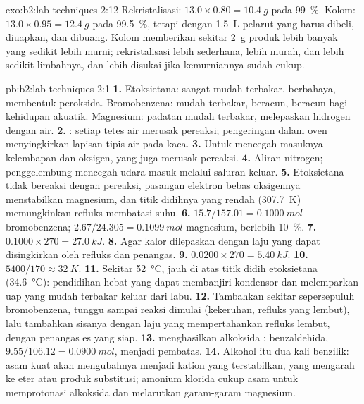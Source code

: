 \begin{solution}{exo:b2:lab-techniques-2:12}
Rekristalisasi: $13.0 \times 0.80 = \qty{10.4}{g}$ pada 99~\%. Kolom: $13.0 \times 0.95 =
\qty{12.4}{g}$ pada 99.5~\%, tetapi dengan \qty{1.5}{L} pelarut yang harus
dibeli, diuapkan, dan dibuang. Kolom memberikan sekitar \qty{2}{g} produk
lebih banyak yang sedikit lebih murni; rekristalisasi lebih sederhana,
lebih murah, dan lebih sedikit limbahnya, dan lebih disukai jika
kemurniannya sudah cukup.
\end{solution}

\begin{solution}{pb:b2:lab-techniques-2:1}
\textbf{1.} Etoksietana: sangat mudah terbakar, berbahaya, membentuk
peroksida. Bromobenzena: mudah terbakar, beracun, beracun bagi kehidupan
akuatik. Magnesium: padatan mudah terbakar, melepaskan hidrogen dengan air.
\textbf{2.} : setiap tetes air merusak
pereaksi; pengeringan dalam oven menyingkirkan lapisan tipis air pada kaca.
\textbf{3.} Untuk mencegah masuknya kelembapan dan oksigen, yang juga merusak pereaksi.
\textbf{4.} Aliran nitrogen; penggelembung mencegah udara masuk melalui saluran keluar.
\textbf{5.} Etoksietana tidak bereaksi dengan pereaksi, pasangan elektron
bebas oksigennya menstabilkan magnesium, dan titik didihnya yang rendah
(\qty{307.7}{K}) memungkinkan refluks membatasi suhu.
\textbf{6.} $15.7/157.01 = \qty{0.1000}{mol}$ bromobenzena; $2.67/24.305 = \qty{0.1099}{mol}$ magnesium,
berlebih 10~\%.
\textbf{7.} $0.1000 \times 270 = \qty{27.0}{kJ}$.
\textbf{8.} Agar kalor dilepaskan dengan laju yang dapat disingkirkan oleh
refluks dan penangas.
\textbf{9.} $0.0200 \times 270 = \qty{5.40}{kJ}$.
\textbf{10.} $5400/170 \approx \qty{32}{K}$.
\textbf{11.} Sekitar \qty{52}{\degreeCelsius}, jauh di atas titik didih
etoksietana (\qty{34.6}{\degreeCelsius}): pendidihan hebat yang dapat
membanjiri kondensor dan melemparkan uap yang mudah terbakar keluar dari
labu.
\textbf{12.} Tambahkan sekitar sepersepuluh bromobenzena, tunggu sampai
reaksi dimulai (kekeruhan, refluks yang lembut), lalu tambahkan sisanya
dengan laju yang mempertahankan refluks lembut, dengan penangas es yang
siap.
\textbf{13.}  menghasilkan alkoksida ; benzaldehida,
$9.55/106.12 = \qty{0.0900}{mol}$, menjadi pembatas.
\textbf{14.} Alkohol itu dua kali benzilik: asam kuat akan mengubahnya
menjadi kation yang terstabilkan, yang mengarah ke eter atau produk
substitusi; amonium klorida cukup asam untuk memprotonasi alkoksida dan
melarutkan garam-garam magnesium.

\end{solution}
